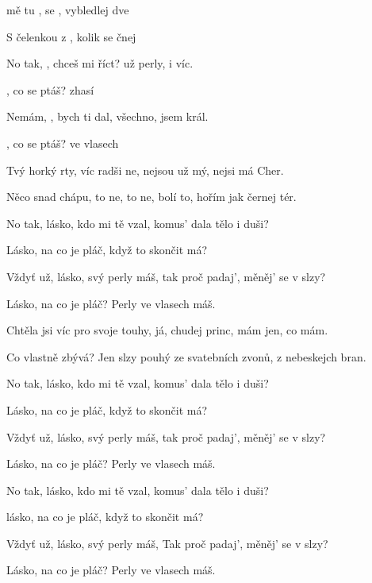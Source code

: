 

\zs
{} mě tu ,  se ,
vybledlej   dve

S čelenkou z   ,
kolik se  čnej 
\ks

\zr
No tak, ,  chceš mi říct?
 už perly,  i víc.

,  co se ptáš?  zhasí

Nemám, ,  bych ti dal,
 všechno,  jsem král.

,  co se ptáš?  ve vlasech 
\kr

\zs
Tvý horký rty, víc radši ne,
nejsou už mý, nejsi má Cher.

Něco snad chápu, to ne, to ne,
bolí to, hořím jak černej tér.
\ks

\zs
No tak, lásko, kdo mi tě vzal,
komus' dala tělo i duši?

Lásko, na co je pláč,
když to skončit má?
\ks

\zs
Vždyť už, lásko, svý perly máš,
tak proč padaj', měněj' se v slzy?

Lásko, na co je pláč?
Perly ve vlasech máš.
\ks

\zr  \kr

\zs
Chtěla jsi víc pro svoje touhy,
já, chudej princ, mám jen, co mám.

Co vlastně zbývá? Jen slzy pouhý
ze svatebních zvonů, z nebeskejch bran.
\ks

\zs
No tak, lásko, kdo mi tě vzal,
komus' dala tělo i duši?

Lásko, na co je pláč,
když to skončit má?
\ks

\zs
Vždyť už, lásko, svý perly máš,
tak proč padaj', měněj' se v slzy?

Lásko, na co je pláč?
Perly ve vlasech máš.
\ks

\zr  \kr

\zr
No tak, lásko, kdo mi tě vzal,
komus' dala tělo i duši?

lásko, na co je pláč,
když to skončit má?
\kr

\zs
Vždyť už, lásko, svý perly máš,
Tak proč padaj', měněj' se v slzy?

Lásko, na co je pláč?
Perly ve vlasech máš.
\ks

\kp
